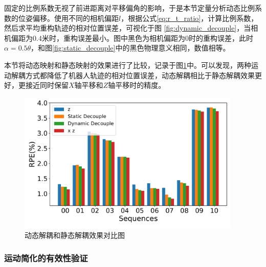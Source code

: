 固定的比例系数无视了前进距离对平移偏角的影响，于是本节定量分析动态比例系数的位姿偏移。使用不同的相机偏距$l$，根据公式\eqref{eq:r_t_ratio}，计算比例系数，然后求平均重构轨迹的相对位置误差，可视化于图 \ref{fig:dynamic_decouple}，当相机偏距为0.4米时，重构误差最小。图中黑色为相机偏距为0时的重构误差，此时 $\alpha = 0.5 \theta$，和图\ref{fig:static_decouple}中的黑色物理意义相同，数值相等。

本节将动态映射和静态映射的效果进行了比较，记录于图\ref{fig:decouple}中。可以发现，两种运动解耦方式都降低了机器人轨迹的相对位置误差，动态解耦相比于静态解耦效果更好，更接近同时保留$X$轴平移和$Z$轴平移时的精度。

\begin{figure}[ht]
    \centering
    \includegraphics[width=0.95\textwidth]{datavo/decouple-crop.pdf}
    \caption{动态解耦和静态解耦效果对比图} 
    \label{fig:decouple}
\end{figure}

\subsubsection{运动简化的有效性验证}

